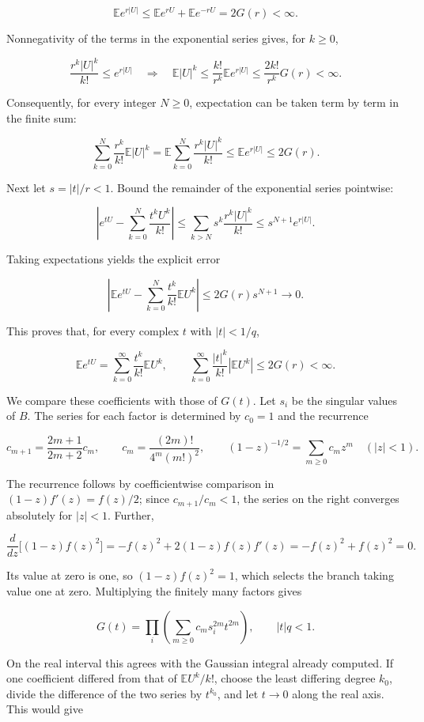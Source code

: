 \documentclass[11pt,a4paper]{article}
\begin{document}
\[
\mathbb E e^{r|U|}
\le\mathbb E e^{rU}+\mathbb E e^{-rU}
=2G(r)<\infty.
\]

Nonnegativity of the terms in the exponential series gives, for \(k\ge0\),

\[
\frac{r^k|U|^k}{k!}\le e^{r|U|}
\quad\Longrightarrow\quad
\mathbb E|U|^k\le\frac{k!}{r^k}\mathbb Ee^{r|U|}
\le\frac{2k!}{r^k}G(r)<\infty.
\]

Consequently, for every integer \(N\ge0\), expectation can be taken term by term in the finite sum:

\[
\sum_{k=0}^{N}\frac{r^k}{k!}\mathbb E|U|^k
=\mathbb E\sum_{k=0}^{N}\frac{r^k|U|^k}{k!}
\le\mathbb Ee^{r|U|}\le2G(r).
\]

Next let \(s=|t|/r<1\). Bound the remainder of the exponential series pointwise:

\[
\left|e^{tU}-\sum_{k=0}^{N}\frac{t^kU^k}{k!}\right|
\le\sum_{k>N}s^k\frac{r^k|U|^k}{k!}
\le s^{N+1}e^{r|U|}.
\]

Taking expectations yields the explicit error

\[
\left|\mathbb Ee^{tU}-\sum_{k=0}^{N}\frac{t^k}{k!}\mathbb EU^k\right|
\le2G(r)s^{N+1}\longrightarrow0.
\]

This proves that, for every complex \(t\) with \(|t|<1/q\),

\[
\mathbb E e^{tU}
=\sum_{k=0}^{\infty}\frac{t^k}{k!}\mathbb E U^k,
\qquad
\sum_{k=0}^{\infty}\frac{|t|^k}{k!}|\mathbb E U^k|
\le2G(r)<\infty.
\]

We compare these coefficients with those of \(G(t)\). Let \(s_i\) be the singular values of \(B\). The series for each factor is determined by \(c_0=1\) and the recurrence

\[
c_{m+1}=\frac{2m+1}{2m+2}c_m,
\qquad
c_m=\frac{(2m)!}{4^m(m!)^2},
\qquad
(1-z)^{-1/2}=\sum_{m\ge0}c_mz^m\quad(|z|<1).
\]

The recurrence follows by coefficientwise comparison in \((1-z)f'(z)=f(z)/2\); since \(c_{m+1}/c_m<1\), the series on the right converges absolutely for \(|z|<1\). Further,

\[
\frac{d}{dz}\bigl[(1-z)f(z)^2\bigr]
=-f(z)^2+2(1-z)f(z)f'(z)
=-f(z)^2+f(z)^2=0.
\]

Its value at zero is one, so \((1-z)f(z)^2=1\), which selects the branch taking value one at zero. Multiplying the finitely many factors gives

\[
G(t)=\prod_i\left(\sum_{m\ge0}c_m s_i^{2m}t^{2m}\right),
\qquad |t|q<1.
\]

On the real interval this agrees with the Gaussian integral already computed. If one coefficient differed from that of \(\mathbb E U^k/k!\), choose the least differing degree \(k_0\), divide the difference of the two series by \(t^{k_0}\), and let \(t\to0\) along the real axis. This would give
\end{document}
